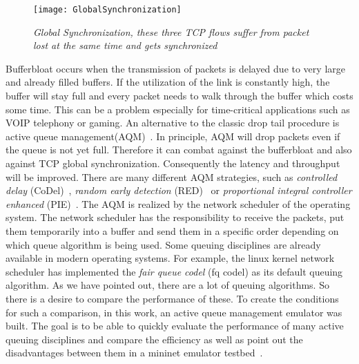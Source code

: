 \begin{figure}[htbp]
\centering
\texttt{[image: GlobalSynchronization]}
\caption{\em Global Synchronization, these three TCP flows suffer from packet lost at the same time and gets synchronized}
\label{fig:globalSynchronization}
\end{figure}

Bufferbloat occurs when the transmission of packets is delayed due to very large and already filled buffers. If the utilization of the link is constantly high, the buffer will stay full and every packet needs to walk through the buffer which costs some time.
This can be a problem especially for time-critical applications such as VOIP telephony or gaming.\newline
An alternative to the classic drop tail procedure is active queue management(AQM)~\cite{6329367}. In principle, AQM will drop packets even if the queue is not yet full. Therefore it can combat against the bufferbloat and also against TCP global synchronization. Consequently the latency and throughput will be improved. There are many different AQM strategies, such as \textit{controlled delay} (CoDel)~\cite{rfc8290}, \textit{random early detection} (RED)~\cite{rfc2309} or \textit{proportional integral controller enhanced} (PIE)~\cite{rfc8033}. The AQM is realized by the network scheduler of the operating system. \newline The network scheduler has the responsibility to receive the packets, put them temporarily into a buffer and send them in a specific order depending on which queue algorithm is being used. Some queuing disciplines are already available in modern operating systems. For example, the linux kernel network scheduler has implemented the \textit{fair queue codel} (fq codel) as its default queuing algorithm.\newline 
As we have pointed out, there are a lot of queuing algorithms. So there is a desire to compare the performance of these. To create the conditions for such a comparison, in this work, an active queue management emulator was built. The goal is to be able to quickly evaluate the performance of many active queuing disciplines and compare the efficiency as well as point out the disadvantages between them in a mininet emulator testbed~\cite{kaur2014mininet}. \newline 
